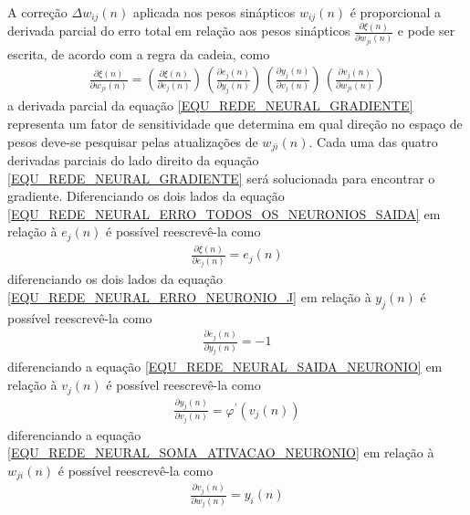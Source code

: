 A correção \(\Delta w_{ij}(n)\) aplicada nos pesos sinápticos \(w_{ij}(n)\) é proporcional a derivada parcial do erro total em relação aos pesos sinápticos \(\frac{\partial \xi(n)}{\partial w_{ji}(n)}\) e pode ser escrita, de acordo com a regra da cadeia, como
\begin{align}
\frac{\partial \xi(n)}{\partial w_{ji}(n)} =
\left( \frac{\partial \xi(n)}{\partial e_{j}(n)} 	\right)	\,
\left( \frac{\partial e_{j}(n)}{\partial y_{j}(n)} 	\right) \,
\left( \frac{\partial y_{j}(n)}{\partial v_{j}(n)} 	\right) \,
\left( \frac{\partial v_{j}(n)}{\partial w_{ji}(n)} \right) \label{EQU_REDE_NEURAL_GRADIENTE}
\end{align}
a derivada parcial da equação \eqref{EQU_REDE_NEURAL_GRADIENTE} representa um fator de sensitividade que determina em qual direção no espaço de pesos deve-se pesquisar pelas atualizações de \(w_{ji}(n)\). Cada uma das quatro derivadas parciais do lado direito da equação \eqref{EQU_REDE_NEURAL_GRADIENTE} será solucionada para encontrar o gradiente. Diferenciando os dois lados da equação \eqref{EQU_REDE_NEURAL_ERRO_TODOS_OS_NEURONIOS_SAIDA} em relação à \(e_{j}(n)\) é possível reescrevê-la como
\begin{align}
\frac{\partial \xi(n)}{\partial e_{j}(n)} = e_{j}(n) \label{EQU_REDE_NEURAL_DERIVADA_ERRO_TOTAL_SOBRE_ERRO}
\end{align}
diferenciando os dois lados da equação \eqref{EQU_REDE_NEURAL_ERRO_NEURONIO_J} em relação à \(y_{j}(n)\) é possível reescrevê-la como
\begin{align}
\frac{\partial e_{j}(n)}{\partial y_{j}(n)} = -1 \label{EQU_REDE_NEURAL_DERIVADA_ERRO_NEURONIO_SOBRE_SINAL_SAIDA_NEURONIO}
\end{align}
diferenciando a equação \eqref{EQU_REDE_NEURAL_SAIDA_NEURONIO} em relação à \(v_{j}(n)\) é possível reescrevê-la como
\begin{align}
\frac{\partial y_{j}(n)}{\partial v_{j}(n)} = \varphi^{'}(v_{j}(n)) \label{EQU_REDE_NEURAL_DERIVADA_SAIDA_NEURONIO_SOBRE_SOMA_ATIVACAO_NEURONIO}
\end{align}
diferenciando a equação \eqref{EQU_REDE_NEURAL_SOMA_ATIVACAO_NEURONIO} em relação à \(w_{ji}(n)\) é possível reescrevê-la como
\begin{align}
\frac{\partial v_{j}(n)}{\partial w_{j}(n)} = y_{i}(n) \label{EQU_REDE_NEURAL_DERIVADA_SOMA_ATIVACAO_NEURONIO_SOBRE_PESOS}
\end{align}
